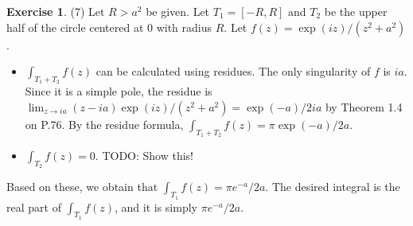 \documentclass[12pt, psamsfonts]{amsart}
\theoremstyle{definition}
\newtheorem*{exer}{Exercise}
\theoremstyle{remark}
\numberwithin{equation}{section}
\begin{document}
\begin{exer}{(7)}
  Let $R > a^2$ be given.
  Let $T_1 = [-R, R]$ and $T_2$ be the upper half of the circle centered at 0 with radius $R$.
  Let $f(z) = \exp(iz) / (z^2 + a^2)$.

  \begin{itemize}
    \item
      $\int_{T_1 + T_2} f(z)$ can be calculated using residues.
      The only singularity of $f$ is $ia$.
      Since it is a simple pole, the residue is $\lim_{z \rightarrow ia} (z - ia)\exp(iz) / (z^2 + a^2) = \exp(-a) / 2ia$ by Theorem 1.4 on P.76.
      By the residue formula, $\int_{T_1 + T_2} f(z) = \pi\exp(-a) / 2a$.
    \item
      $\int_{T_2} f(z) = 0$.
      TODO: Show this!
  \end{itemize}
  Based on these, we obtain that $\int_{T_1} f(z) = \pi e^{-a} / 2a$.
  The desired integral is the real part of $\int_{T_1} f(z)$, and it is simply $\pi e^{-a} / 2a$.
\end{exer}
\end{document}
